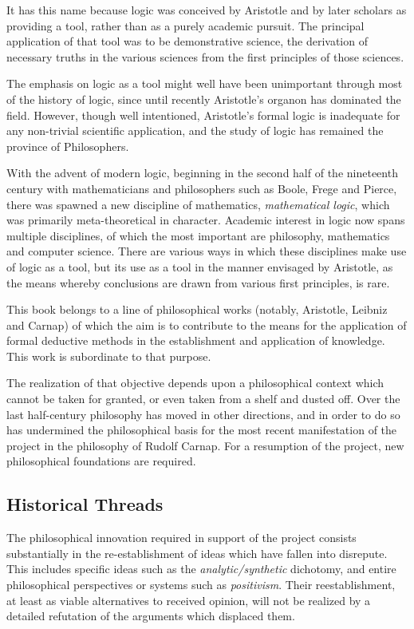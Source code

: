 It has this name because logic was conceived by Aristotle and by later
scholars as providing a tool, rather than as a purely academic
pursuit.
The principal application of that tool was to be demonstrative
science, the derivation of necessary truths in the various sciences
from the first principles of those sciences. 
 
The emphasis on logic as a tool might well have been unimportant
through most of the history of logic, since until recently Aristotle's
organon has dominated the field.
However, though well intentioned, Aristotle's formal logic is
inadequate for any non-trivial scientific application, and the study
of logic has remained the province of Philosophers.

With the advent of modern logic, beginning in the second half of the
nineteenth century with mathematicians and philosophers such as Boole,
Frege and Pierce, there was spawned a new discipline of mathematics,
\emph{mathematical logic}, which was primarily meta-theoretical in
character.
Academic interest in logic now spans multiple disciplines, of which
the most important are philosophy, mathematics and computer science.
There are various ways in which these disciplines make use of
logic as a tool, but its use as a tool in the manner envisaged by
Aristotle, as the means whereby conclusions are drawn from various
first principles, is rare.

This book belongs to a line of philosophical works (notably,
Aristotle, Leibniz and Carnap) of which the aim is
to contribute to the means for the application of formal deductive
methods in the establishment and application of knowledge.
This work is subordinate to that purpose.

The realization of that objective depends upon a philosophical
context which cannot be taken for granted, or even taken from a shelf
and dusted off.
Over the last half-century philosophy has moved in other directions,
and in order to do so has undermined the philosophical basis for the
most recent manifestation of the project in the philosophy of Rudolf
Carnap.
For a resumption of the project, new philosophical foundations are
required.

\subsection{Historical Threads}

The philosophical innovation required in support of the project
consists substantially in the re-establishment of ideas which have
fallen into disrepute.
This includes specific ideas such as the \emph{analytic/synthetic}
dichotomy, and entire philosophical perspectives or systems such as
\emph{positivism}.
Their reestablishment, at least as viable alternatives to received
opinion, will not be realized by a detailed refutation of the
arguments which displaced them.


